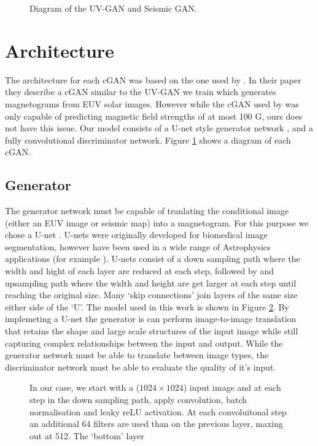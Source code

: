 \documentclass[11pt,a4paper,onecolumn]{report}
\begin{document}
\begin{figure}
  \centering
  \caption{Diagram of the UV-GAN and Seismic GAN.}
  \label{fig:solar_gans_diagram}
\end{figure}

%
%
%
%
%
\section{Architecture}
%
%
%
%
%
%

The architecture for each cGAN was based on the one used by \citet{Kim2019}. In
their paper they describe a cGAN similar to the UV-GAN we train which generates
magnetograms from EUV solar images. However while the cGAN used by
\citet{Kim2019} was only capable of predicting magnetic field strengths of at
most 100 G, ours does not have this issue. Our model consists of a U-net style generator network
\citep{ronneberger_u-net_2015}, and a fully convolutional discriminator network. Figure
\ref{fig:solar_gans_diagram} shows a diagram of each cGAN.


\subsection{Generator}
The generator network must be capable of tranlating the conditional image
(either an EUV image or seismic map) into a magnetogram. For this purpose we
chose a U-net \citep{ronneberger_u-net_2015}. U-nets were originally developed
for biomedical image segmentation, however have been used in a wide range of
Astrophysics applications (for example
\citet{felipe_improved_2019,bekki_quantifying_2021,baso_solar_2019}). U-nets
consist of a down sampling path where the width and hight of each layer are
reduced at each step, followed by and upsampling path where the width and height
are get larger at each step until reaching the original size. Many `skip
connections' join layers of the same size either side of the `U'. The model used
in this work is shown in Figure \ref{fig:gen_model}. By implemeting a U-net the
generator is can perform image-to-image translation that retains the shape and
large scale structures of the input image while still capturing complex
relationships between the input and output. While the generator network must be
able to translate between image types, the discriminator network must be able to
evaluate the quality of it's input.

  \begin{figure}
    \centering
    \caption{
      In our case, we start with a ($1024\times 1024$) input image and at each step
      in the down sampling path, apply convolution, batch normalisation and leaky
      reLU activation.%
      At each convoluitonal step an additional 64 filters are used than on the
      previous layer, maxing out at 512. The `bottom' layer 
    }
    \label{fig:gen_model}
  \end{figure}
\end{document}
